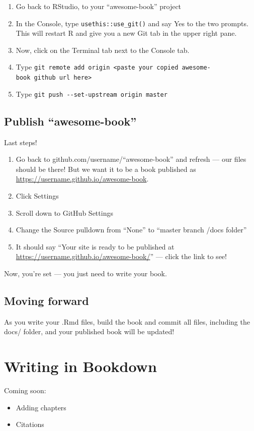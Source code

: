 \documentclass[
]{book}
\providecommand{\tightlist}{%
  \setlength{\itemsep}{0pt}\setlength{\parskip}{0pt}}
\theoremstyle{definition}
\theoremstyle{definition}
\theoremstyle{definition}
\theoremstyle{remark}
\begin{document}
\begin{enumerate}
\def\labelenumi{\arabic{enumi}.}
\tightlist
\item
  Go back to RStudio, to your ``awesome-book'' project
\item
  In the Console, type \texttt{usethis::use\_git()} and say Yes to the two prompts. This will restart R and give you a new Git tab in the upper right pane.
\item
  Now, click on the Terminal tab next to the Console tab.
\item
  Type \texttt{git\ remote\ add\ origin\ \textless{}paste\ your\ copied\ awesome-book\ github\ url\ here\textgreater{}}
\item
  Type \texttt{git\ push\ -\/-set-upstream\ origin\ master}
\end{enumerate}

\hypertarget{publish-awesome-book}{%
\section{Publish ``awesome-book''}\label{publish-awesome-book}}

Last steps!

\begin{enumerate}
\def\labelenumi{\arabic{enumi}.}
\tightlist
\item
  Go back to github.com/username/``awesome-book'' and refresh --- our files should be there! But we want it to be a book published as \url{https://username.github.io/awesome-book}.
\item
  Click Settings
\item
  Scroll down to GitHub Settings
\item
  Change the Source pulldown from ``None'' to ``master branch /docs folder''
\item
  It should say ``Your site is ready to be published at \url{https://username.github.io/awesome-book/}'' --- click the link to see!
\end{enumerate}

Now, you're set --- you just need to write your book.

\hypertarget{moving-forward}{%
\section{Moving forward}\label{moving-forward}}

As you write your .Rmd files, build the book and commit all files, including the docs/ folder, and your published book will be updated!

\hypertarget{write}{%
\chapter{Writing in Bookdown}\label{write}}

Coming soon:

\begin{itemize}
\tightlist
\item
  Adding chapters
\item
  Citations
\end{itemize}
\end{document}
